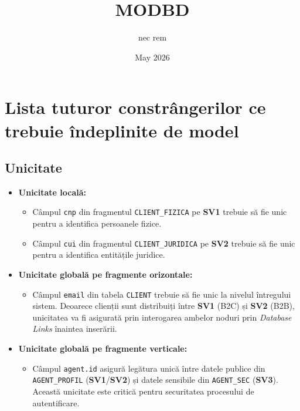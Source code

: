 \documentclass{article}
\title{MODBD}
\author{nec rem}
\date{May 2026}
\begin{document}
\chapter{Lista tuturor constrângerilor ce trebuie îndeplinite de model}
\label{sec:constrangeri}
\section{Unicitate}
\begin{itemize}
\item \textbf{Unicitate locală:}

\begin{itemize}
\item Câmpul \texttt{cnp} din fragmentul \texttt{CLIENT\_FIZICA} pe \textbf{SV1} trebuie să fie unic pentru a identifica persoanele fizice.
\item Câmpul \texttt{cui} din fragmentul \texttt{CLIENT\_JURIDICA} pe \textbf{SV2} trebuie să fie unic pentru a identifica entitățile juridice.
\end{itemize}

\item \textbf{Unicitate globală pe fragmente orizontale:}
\begin{itemize}

\item Câmpul \texttt{email} din tabela \texttt{CLIENT} trebuie să fie unic la nivelul întregului sistem. Deoarece clienții sunt distribuiți între \textbf{SV1} (B2C) și \textbf{SV2} (B2B), unicitatea va fi asigurată prin interogarea ambelor noduri prin \textit{Database Links} înaintea inserării.

\end{itemize}
\item 
\textbf{Unicitate globală pe fragmente verticale:}

\begin{itemize}

\item Câmpul \texttt{agent.id} asigură legătura unică între datele publice din \texttt{AGENT\_PROFIL} (\textbf{SV1}/\textbf{SV2}) și datele sensibile din \texttt{AGENT\_SEC} (\textbf{SV3}). Această unicitate este critică pentru securitatea procesului de autentificare.

\end{itemize}
\end{itemize}
\end{document}
